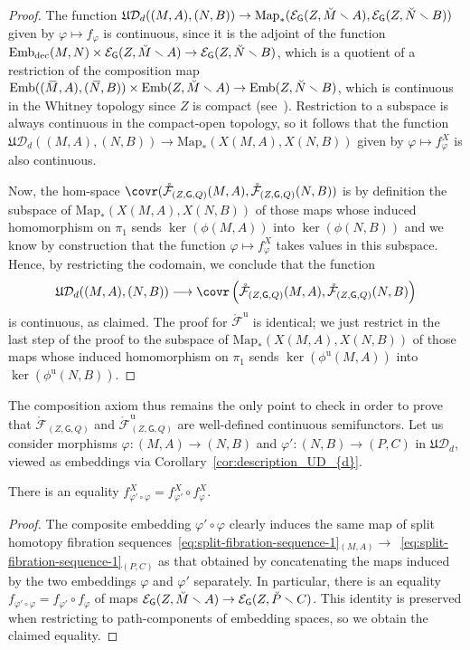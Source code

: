\documentclass[AHL,Unicode,published]{cedram}
\newcommand{\Emb}{\mathrm{Emb}}
\newcommand{\Map}{\mathrm{Map}}
\newcommand{\Int}{\mathring}
\newcommand{\unt}{\mathrm{u}}
\newcommand{\rdec}{\mathrm{dec}}
\newcommand{\mbar}{\ensuremath{{\,\,\overline{\!\! M\!}\,}}}
\newcommand{\nbar}{\ensuremath{{\,\,\overline{\!\! N}}}}
\newcommand{\fU}{\ensuremath{\mathfrak{U}}}
\newcommand{\sG}{\mathsf{G}}
\newcommand{\cD}{\mathcal{D}}
\newcommand{\cE}{\mathcal{E}}
\newcommand{\cF}{\mathcal{F}}
\newcommand{\too}{\ensuremath{\longrightarrow}}
\newcommand{\embdec}{\ensuremath{\mathrm{Emb}_{\rdec}}}
\begin{document}
\begin{proof}
The function $\fU\cD_{d}((M,A),(N,B)) \to \Map_*(\cE_{\sG}(Z,\Breve{M}\smallsetminus A), \cE_{\sG}(Z,\Breve{N}\smallsetminus B))$ given by $\varphi \mapsto f_{\varphi}$ is continuous, since it is the adjoint of the function $\embdec(M,N) \times \cE_{\sG}(Z,\Breve{M}\smallsetminus A) \to \cE_{\sG}(Z,\Breve{N}\smallsetminus B)$, which is a quotient of a restriction of the composition map $\Emb((\mbar,A),(\nbar,B)) \times \Emb(Z,\Breve{M}\smallsetminus A) \to \Emb(Z,\Breve{N}\smallsetminus B)$, which is continuous in the Whitney topology since $Z$ is compact (see~\cite[\S~2, Prop.~1]{Mather1969}). Restriction to a subspace is always continuous in the compact-open topology, so it follows that the function $\fU\cD_{d}((M,A),(N,B)) \to \Map_*(X(M,A),X(N,B))$ given by $\varphi \mapsto f^{X}_{\varphi}$ is also continuous.

Now, the hom-space $\covr(\Int{\cF}_{(Z,\sG,Q)}(M,A), \Int{\cF}_{(Z,\sG,Q)}(N,B))$ is by definition the subspace of $\Map_*(X(M,A),X(N,B))$ of those maps whose induced homomorphism on $\pi_{1}$ sends $\ker(\phi(M,A))$ into $\ker(\phi(N,B))$ and we know by construction that the function $\varphi \mapsto f^{X}_{\varphi}$ takes values in this subspace. Hence, by restricting the codomain, we conclude that the function
\[
\fU\cD_{d}((M,A),(N,B)) \too \covr\left(\Int{\cF}_{(Z,\sG,Q)}(M,A), \Int{\cF}_{(Z,\sG,Q)}(N,B)\right)
\]
is continuous, as claimed. The proof for $\Int{\cF}^{\unt}$ is identical; we just restrict in the last step of the proof to the subspace of $\Map_*(X(M,A),X(N,B))$ of those maps whose induced homomorphism on $\pi_{1}$ sends $\ker(\phi^{\unt}(M,A))$ into $\ker(\phi^{\unt}(N,B))$.
\end{proof}

The composition axiom thus remains the only point to check in order to prove that $\Int{\cF}_{(Z,\sG,Q)}$ and $\Int{\cF}^{\unt}_{(Z,\sG,Q)}$ are well-defined continuous semifunctors. Let us consider morphisms $\varphi \colon (M,A) \to (N,B)$ and $\varphi' \colon (N,B) \to (P,C)$ in $\fU\cD_{d}$, viewed as embeddings via Corollary~\ref{cor:description_UD_{d}}.

\begin{lemm}\label{lem:composition_axiom}
There is an equality $f^{X}_{\varphi'\circ\varphi}=f^{X}_{\varphi'}\circ f^{X}_{\varphi}$.
\end{lemm}

\begin{proof}
The composite embedding $\varphi'\circ\varphi$ clearly induces the same map of split homotopy fibration sequences~\eqref{eq:split-fibration-sequence-1}$_{(M,A)} \to$~\eqref{eq:split-fibration-sequence-1}$_{(P,C)}$ as that obtained by concatenating the maps induced by the two embeddings $\varphi$ and $\varphi'$ separately. In particular, there is an equality $f_{\varphi'\circ\varphi}=f_{\varphi'} \circ f_{\varphi}$ of maps $\cE_{\sG}(Z,\Breve{M}\smallsetminus A) \to \cE_{\sG}(Z,\Breve{P}\smallsetminus C)$. This identity is preserved when restricting to path-components of embedding spaces, so we obtain the claimed equality.
\end{proof}
\end{document}
